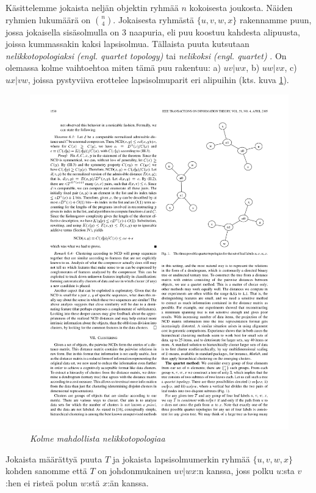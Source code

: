 \documentclass[12pt,finnish]{tktltiki2}
\theoremstyle{definition}
\theoremstyle{remark}
\newcommand{\engl}[1]{\emph{(engl. #1)}}
\begin{document}
    Käsittelemme jokaista neljän objektin ryhmää $n$ kokoisesta joukosta. Näiden ryhmien lukumäärä on $\binom{n}{4}$.
    Jokaisesta ryhmästä $\{u,v,w,x\}$ rakennamme puun, jossa jokaisella sisäsolmulla on 3 naapuria, eli puu koostuu kahdesta alipuusta, joissa kummassakin kaksi lapsisolmua.
    Tällaista puuta kutsutaan \emph{nelikkotopologiaksi} \engl{quartet topology} \cite{CV05} tai \emph{nelikoksi} \engl{quartet} \cite{10.1109/WDM.2004.1358107}.
    On olemassa kolme vaihtoehtoa miten tämä puu rakentuu: a) $uv|wx$, b) $uw|vx$, c) $ux|vw$, joissa pystyviiva erottelee lapsisolmuparit eri alipuihin (kts. kuva \ref{fig:ternary-tree}).

    \begin{figure}[tb]
      \immediate{}
      \includegraphics{img/ternary-tree}
      \caption{\emph{Kolme mahdollista nelikkotopologiaa}
      \cite{CV05}}
      \label{fig:ternary-tree}
    \end{figure}


    Jokaista määrättyä puuta $T$ ja jokaista lapsisolmumerkin ryhmää $\{u,v,w,x\}$ kohden sanomme että $T$ on johdonmukainen $uv|wx$:n kanssa, joss polku $u$:sta $v$:hen ei risteä polun $w$:stä $x$:än kanssa.
\end{document}
